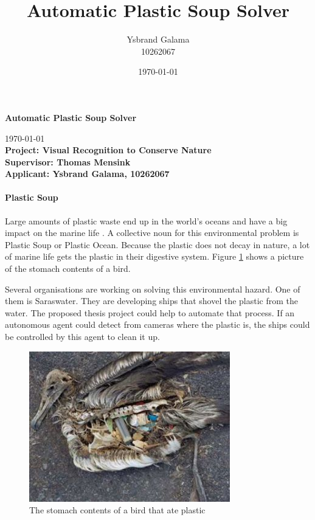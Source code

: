 \documentclass[a4paper, 12pt]{article}
\title{Automatic Plastic Soup Solver}
\author{Ysbrand Galama \\ 10262067}
\date{\today}
\begin{document}
\begin{center}
\huge \bf Automatic Plastic Soup Solver
\end{center}
\noindent
\hfill \today\\
{\bf
Project: Visual Recognition to Conserve Nature\\
Supervisor: Thomas Mensink\\
Applicant: Ysbrand Galama, 10262067
}

\noindent

\paragraph{Plastic Soup} Large amounts of plastic waste end up in the world's oceans and have a big impact on the marine life \citep{barnes2005drifting}.
A collective noun for this environmental problem is Plastic Soup or Plastic Ocean.
Because the plastic does not decay in nature, a lot of marine life gets the plastic in their digestive system.
Figure \ref{fig:plastic-bird} shows a picture of the stomach contents of a bird.

Several organisations are working on solving this environmental hazard.
One of them is Saraswater.
They are developing ships that shovel the plastic from the water.
The proposed thesis project could help to automate that process.
If an autonomous agent could detect from cameras where the plastic is, the ships could be controlled by this agent to clean it up.

\begin{figure}[h!bt]
\centering
\includegraphics[keepaspectratio=true,width=.5\textwidth]{images/Bird_with_plastic_stomach.jpg}
\caption{The stomach contents of a bird that ate plastic}
\label{fig:plastic-bird}
\end{figure}
\end{document}
